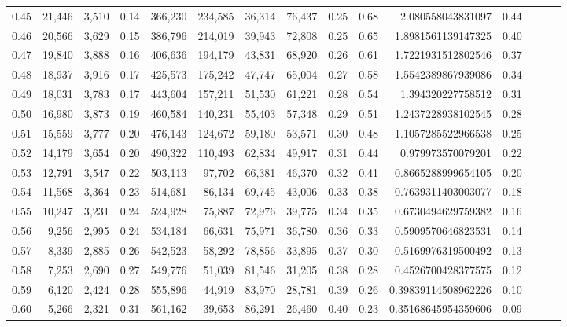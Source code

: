 \begin{tabular}{rrrrrrrrrrrrrrr}
0.45 &  21,446 &  3,510 &  0.14 &  366,230 &  234,585 &   36,314 &   76,437 &  0.25 &  0.68 &       2.080558043831097 &      0.44 \\
0.46 &  20,566 &  3,629 &  0.15 &  386,796 &  214,019 &   39,943 &   72,808 &  0.25 &  0.65 &      1.8981561139147325 &      0.40 \\
0.47 &  19,840 &  3,888 &  0.16 &  406,636 &  194,179 &   43,831 &   68,920 &  0.26 &  0.61 &      1.7221931512802546 &      0.37 \\
0.48 &  18,937 &  3,916 &  0.17 &  425,573 &  175,242 &   47,747 &   65,004 &  0.27 &  0.58 &      1.5542389867939086 &      0.34 \\
0.49 &  18,031 &  3,783 &  0.17 &  443,604 &  157,211 &   51,530 &   61,221 &  0.28 &  0.54 &       1.394320227758512 &      0.31 \\
0.50 &  16,980 &  3,873 &  0.19 &  460,584 &  140,231 &   55,403 &   57,348 &  0.29 &  0.51 &      1.2437228938102545 &      0.28 \\
0.51 &  15,559 &  3,777 &  0.20 &  476,143 &  124,672 &   59,180 &   53,571 &  0.30 &  0.48 &      1.1057285522966538 &      0.25 \\
0.52 &  14,179 &  3,654 &  0.20 &  490,322 &  110,493 &   62,834 &   49,917 &  0.31 &  0.44 &       0.979973570079201 &      0.22 \\
0.53 &  12,791 &  3,547 &  0.22 &  503,113 &   97,702 &   66,381 &   46,370 &  0.32 &  0.41 &      0.8665288999654105 &      0.20 \\
0.54 &  11,568 &  3,364 &  0.23 &  514,681 &   86,134 &   69,745 &   43,006 &  0.33 &  0.38 &      0.7639311403003077 &      0.18 \\
0.55 &  10,247 &  3,231 &  0.24 &  524,928 &   75,887 &   72,976 &   39,775 &  0.34 &  0.35 &      0.6730494629759382 &      0.16 \\
0.56 &   9,256 &  2,995 &  0.24 &  534,184 &   66,631 &   75,971 &   36,780 &  0.36 &  0.33 &      0.5909570646823531 &      0.14 \\
0.57 &   8,339 &  2,885 &  0.26 &  542,523 &   58,292 &   78,856 &   33,895 &  0.37 &  0.30 &      0.5169976319500492 &      0.13 \\
0.58 &   7,253 &  2,690 &  0.27 &  549,776 &   51,039 &   81,546 &   31,205 &  0.38 &  0.28 &      0.4526700428377575 &      0.12 \\
0.59 &   6,120 &  2,424 &  0.28 &  555,896 &   44,919 &   83,970 &   28,781 &  0.39 &  0.26 &     0.39839114508962226 &      0.10 \\
0.60 &   5,266 &  2,321 &  0.31 &  561,162 &   39,653 &   86,291 &   26,460 &  0.40 &  0.23 &     0.35168645954359606 &      0.09 \\

\end{tabular}
